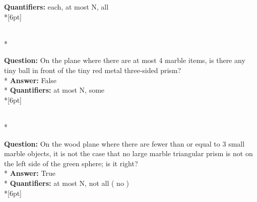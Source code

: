 \begin{figure*}
\begin{minipage}{0.48\textwidth}
\begin{minipage}[t][2.2cm][t]{1\textwidth}
      \textbf{Quantifiers:} each, at most N, all \\*[6pt]
    \end{minipage}\\*
    \begin{minipage}[t][2.2cm][t]{1\textwidth}
      \footnotesize
      \textbf{Question:} On the plane where there are at most 4 marble items, is there any tiny ball in front of the tiny red metal three-sided prism? \\*
      \textbf{Answer:} False \\*
      \textbf{Quantifiers:} at most N, some \\*[6pt]
    \end{minipage}\\*
    \begin{minipage}[t][2.2cm][t]{1\textwidth}
      \footnotesize
      \textbf{Question:} On the wood plane where there are fewer than or equal to 3 small marble objects, it is not the case that no large marble triangular prism is not on the left side of the green sphere; is it right? \\*
      \textbf{Answer:} True \\*
      \textbf{Quantifiers:} at most N, not all ( no ) \\*[6pt]
    \end{minipage}
  \end{minipage}
\end{figure*}




